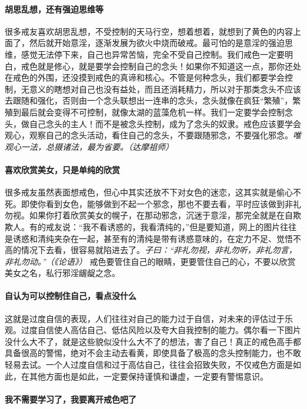 \paragraph{胡思乱想，还有强迫思维等}

很多戒友喜欢胡思乱想，不受控制的天马行空，想着想着，就想到了黄色的内容上面了，然后就开始意淫，逐渐发展为欲火中烧而破戒。最可怕的是意淫的强迫思维，感觉无法停下来，自己也异常苦恼，完全不受自己控制。我们戒色一定要明白，戒色就是修心，就是要学会控制自己的念头！如果你不知道这一点，那你还处在戒色的外围，还没摸到戒色的真谛和核心。不管是何种念头，我们都要学会控制，无意义的瞎想对自己也没有益处，而且还消耗精力，所以对于那类念头不应该去跟随和强化，否则由一个念头联想出一连串的念头，念头就像在疯狂“繁殖”，繁殖到最后就会变得不可控制，就像太湖的蓝藻危机一样。我们一定要学会控制念头，做自己念头的主人！而不是被念头控制，成为了念头的奴隶。戒色应该要学会观心，观察自己的念头活动，看住自己的念头，不要跟随邪念，不要强化邪念。\textit{唯观心一法，总摄诸法，最为省要。（达摩祖师）}

\paragraph{喜欢欣赏美女，只是单纯的欣赏}

很多戒友虽然表面想戒色，但心中其实还放不下对女色的迷恋，这其实就是偷心不死。即使你看到女色，能够做到不起一个邪念，那也不要去看，平时应该做到非礼勿视。如果你打着欣赏美女的幌子，在那动邪念，沉迷于意淫，那完全就是在自欺欺人。有的戒友说：“我不看诱惑的，我看清纯的，”但是要知道，网上的图片往往是诱惑和清纯夹杂在一起，甚至有的清纯是带有诱惑意味的，在定力不足、觉悟不高的情况下去看，很容易就陷进去了。\textit{子曰：“非礼勿视，非礼勿听，非礼勿言，非礼勿动。”（《论语》）} 戒色要管住自己的眼睛，更要管住自己的心，不要以欣赏美女之名，私行邪淫龌龊之念。

\paragraph{自认为可以控制住自己，看点没什么}

这就是过度自信的表现，人们往往对自己的能力过于自信，对未来的评估过于乐观。过度自信使人高估自己、低估风险以及夸大自我控制的能力。偶尔看一下图片没什么大不了，就是这些貌似没什么大不了的想法，害了自己！真正的戒色高手都具备很高的警惕，绝对不会主动去看黄，即使具备了极高的念头控制能力，也不敢轻易去试。一个人过度自信和过于高估自己，往往会招致失败，不仅戒色方面是如此，在其他方面也是如此，一定要保持谨慎和谦虚，一定要有警惕意识。

\paragraph{我不需要学习了，我要离开戒色吧了}

